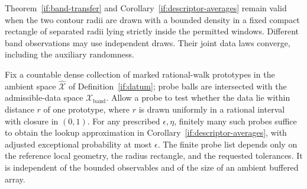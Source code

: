 \begin{corollary}
\label{if:random-levels}
Theorem~\ref{if:band-transfer} and
Corollary~\ref{if:descriptor-averages} remain valid when the two contour radii are
drawn with a bounded density in a fixed compact rectangle of separated
radii lying strictly inside the permitted windows.  Different band
observations may use independent draws.  Their joint data laws
converge, including the auxiliary randomness.

Fix a countable dense collection of marked rational-walk prototypes
in the ambient space $\widehat{\mathcal X}$ of
Definition~\ref{if:datum}; probe balls are intersected with the
admissible-data space $\mathcal X_{\mathrm{band}}$. Allow a probe to test
whether the data lie within distance $r$ of one prototype, where
$r$ is drawn uniformly in a rational interval with closure in $(0,1)$.
For any prescribed $\epsilon,\eta$, finitely many such probes suffice
to obtain the lookup approximation in
Corollary~\ref{if:descriptor-averages}, with adjusted exceptional
probability at most $\epsilon$.  The finite probe list depends only
on the reference local geometry, the radius rectangle, and the
requested tolerances.  It is independent of the bounded observables
and of the size of an ambient buffered array.
\end{corollary}

